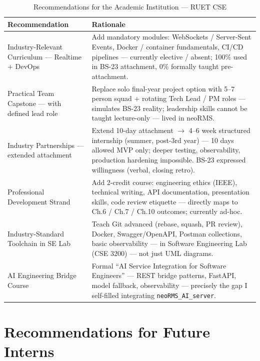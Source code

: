 \begin{table}[H]
\centering
\caption{Recommendations for the Academic Institution --- RUET CSE}
\label{tab:rec_uni}
\begin{tabularx}{\textwidth}{@{}p{}X@{}}
\toprule
\textbf{Recommendation} & \textbf{Rationale} \\
\midrule
Industry-Relevant Curriculum --- Realtime + DevOps & Add mandatory modules: WebSockets / Server-Sent Events, Docker / container fundamentals, CI/CD pipelines --- currently elective / absent; 100\% used in BS-23 attachment, 0\% formally taught pre-attachment. \\
Practical Team Capstone --- with defined lead role & Replace solo final-year project option with 5--7 person squad + rotating Tech Lead / PM roles --- simulates BS-23 reality; leadership skills cannot be taught lecture-only --- lived in neoRMS. \\
Industry Partnerships --- extended attachment & Extend 10-day attachment $\rightarrow$ 4--6 week structured internship (summer, post-3rd year) --- 10 days allowed MVP only; deeper testing, observability, production hardening impossible. BS-23 expressed willingness (verbal, closing retro). \\
Professional Development Strand & Add 2-credit course: engineering ethics (IEEE), technical writing, API documentation, presentation skills, code review etiquette --- directly maps to Ch.6 / Ch.7 / Ch.10 outcomes; currently ad-hoc. \\
Industry-Standard Toolchain in SE Lab & Teach Git advanced (rebase, squash, PR review), Docker, Swagger/OpenAPI, Postman collections, basic observability --- in Software Engineering Lab (CSE 3200) --- not just UML diagrams. \\
AI Engineering Bridge Course & Formal ``AI Service Integration for Software Engineers'' --- REST bridge patterns, FastAPI, model fallback, observability --- precisely the gap I self-filled integrating \texttt{neoRMS\_AI\_server}. \\
\bottomrule
\end{tabularx}
\end{table}

\section{Recommendations for Future Interns}

